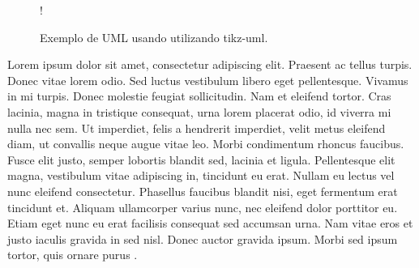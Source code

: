 \documentclass[tec, ads, scr, classic, a4paper,twoside]{ifbatcc}
\begin{document}
\begin{figure}[htbp]
  \begin{center}
    \resizebox {0.7\textwidth} {!} {
    }
  \end{center}
  \caption{Exemplo de UML usando utilizando tikz-uml.}
  \label{fig:uml}
\end{figure}


\label{cap:revisao}


Lorem ipsum dolor sit amet, consectetur adipiscing elit. Praesent ac tellus turpis. Donec vitae lorem odio. Sed luctus vestibulum libero eget pellentesque. Vivamus in mi turpis. Donec molestie feugiat sollicitudin. Nam et eleifend tortor. Cras lacinia, magna in tristique consequat, urna lorem placerat odio, id viverra mi nulla nec sem. Ut imperdiet, felis a hendrerit imperdiet, velit metus eleifend diam, ut convallis neque augue vitae leo. Morbi condimentum rhoncus faucibus. Fusce elit justo, semper lobortis blandit sed, lacinia et ligula. Pellentesque elit magna, vestibulum vitae adipiscing in, tincidunt eu erat. Nullam eu lectus vel nunc eleifend consectetur. Phasellus faucibus blandit nisi, eget fermentum erat tincidunt et. Aliquam ullamcorper varius nunc, nec eleifend dolor porttitor eu. Etiam eget nunc eu erat facilisis consequat sed accumsan urna. Nam vitae eros et justo iaculis gravida in sed nisl. Donec auctor gravida ipsum. Morbi sed ipsum tortor, quis ornare purus \cite{demeyer2008}.
\end{document}
